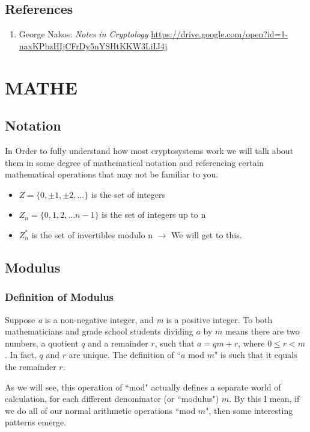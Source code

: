 \documentclass{report}
\begin{document}
\vspace{1cm}
\section{References}
\label{ref:2}
\begin{enumerate}[label=(\alph*)]
\item George Nakos: \textit{Notes in Cryptology} \url{ https://drive.google.com/open?id=1-naxKPbzHIjCFrDy5nYSHtKKW3LiIJ4j}
\end{enumerate}

\chapter{MATHE}
\section{Notation}
In Order to fully understand how most cryptosystems work we will talk about them in some degree of mathematical notation and referencing certain mathematical operations that may not be familiar to you.\newline 
\begin{itemize}
\item $ Z = \{0, \pm1, \pm2,...\} $ is the set of integers
\item $Z_n= \{0, 1, 2, ... n-1\}$ is the set of integers up to n
\item $Z^*_n$ is the set of invertibles modulo n $\rightarrow$ We will get to this.
\end{itemize}

\section{Modulus}
\subsection{Definition of Modulus}
Suppose \textit{a} is a non-negative integer, and \textit{m} is a positive integer. To both mathematicians and grade school students dividing 
$a$  by $m$ means there are two numbers, a quotient $q$ and a remainder $r$, 
such that $a=qm+r$, where $0 \leq r<m$. In fact, $q$ and $r$ are unique. The definition of ``$a$ mod $m$" is such that it equals the remainder $r$.

As we will see, this operation of ``mod" actually defines a separate world of calculation, for each different denominator (or ``modulus") $m$. By this I mean, if we do all of our normal arithmetic operations ``mod $m$", then some interesting patterns emerge.
\end{document}
